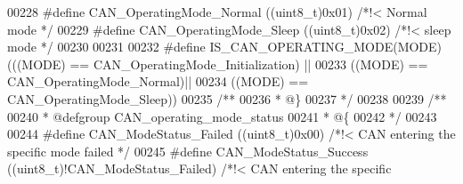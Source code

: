 \begin{DoxyCode}
00228 \textcolor{preprocessor}{#}\textcolor{preprocessor}{define} \textcolor{preprocessor}{CAN\_OperatingMode\_Normal}          \textcolor{preprocessor}{(}\textcolor{preprocessor}{(}\textcolor{preprocessor}{uint8\_t}\textcolor{preprocessor}{)}0x01\textcolor{preprocessor}{)} \textcolor{comment}{/*!< Normal mode */}
00229 \textcolor{preprocessor}{#}\textcolor{preprocessor}{define} \textcolor{preprocessor}{CAN\_OperatingMode\_Sleep}           \textcolor{preprocessor}{(}\textcolor{preprocessor}{(}\textcolor{preprocessor}{uint8\_t}\textcolor{preprocessor}{)}0x02\textcolor{preprocessor}{)} \textcolor{comment}{/*!< sleep mode */}
00230 
00231 
00232 \textcolor{preprocessor}{#}\textcolor{preprocessor}{define} \textcolor{preprocessor}{IS\_CAN\_OPERATING\_MODE}\textcolor{preprocessor}{(}\textcolor{preprocessor}{MODE}\textcolor{preprocessor}{)} \textcolor{preprocessor}{(}\textcolor{preprocessor}{(}\textcolor{preprocessor}{(}\textcolor{preprocessor}{MODE}\textcolor{preprocessor}{)} \textcolor{preprocessor}{==} 
      CAN_OperatingMode_Initialization\textcolor{preprocessor}{)} \textcolor{preprocessor}{||}
00233                                     \textcolor{preprocessor}{(}\textcolor{preprocessor}{(}\textcolor{preprocessor}{MODE}\textcolor{preprocessor}{)} \textcolor{preprocessor}{==} CAN_OperatingMode_Normal\textcolor{preprocessor}{)}\textcolor{preprocessor}{||}
00234                                                                         \textcolor{preprocessor}{(}\textcolor{preprocessor}{(}\textcolor{preprocessor}{MODE}\textcolor{preprocessor}{)} \textcolor{preprocessor}{==} 
      CAN_OperatingMode_Sleep\textcolor{preprocessor}{)}\textcolor{preprocessor}{)}
00235 \textcolor{comment}{/**}
00236 \textcolor{comment}{  * @\}}
00237 \textcolor{comment}{  */}
00238 
00239 \textcolor{comment}{/**}
00240 \textcolor{comment}{  * @defgroup CAN\_operating\_mode\_status}
00241 \textcolor{comment}{  * @\{}
00242 \textcolor{comment}{  */}
00243 
00244 \textcolor{preprocessor}{#}\textcolor{preprocessor}{define} \textcolor{preprocessor}{CAN\_ModeStatus\_Failed}    \textcolor{preprocessor}{(}\textcolor{preprocessor}{(}\textcolor{preprocessor}{uint8\_t}\textcolor{preprocessor}{)}0x00\textcolor{preprocessor}{)}                \textcolor{comment}{/*!< CAN entering the specific mode
       failed */}
00245 \textcolor{preprocessor}{#}\textcolor{preprocessor}{define} \textcolor{preprocessor}{CAN\_ModeStatus\_Success}   \textcolor{preprocessor}{(}\textcolor{preprocessor}{(}\textcolor{preprocessor}{uint8\_t}\textcolor{preprocessor}{)}\textcolor{preprocessor}{!}CAN_ModeStatus_Failed\textcolor{preprocessor}{)}   \textcolor{comment}{/*!< CAN entering the specific
}
\end{DoxyCode}
